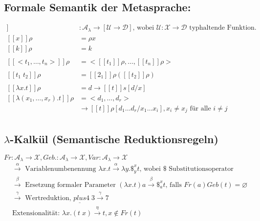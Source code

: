 \subsection{Formale Semantik der Metasprache:}
\begin{align*}
[\![ \; ]\!] &: \mathcal{A}_\lambda \rightarrow [\mathcal{U} \rightarrow \mathcal{D}] \text{, wobei } \mathcal{U}:\mathcal{X} \rightarrow \mathcal{D} \text{ typhaltende Funktion.}\\
[\![ x ]\!] \rho &= \rho x \\
[\![ k ]\!] \rho &= k \tag{1}\\
\\
[\![ <t_1, \dots, t_n> ]\!] \rho &= <[\![ t_1 ]\!]\rho, \dots , [\![ t_n ]\!] \rho > \tag{2}\\
\\
[\![ t_1 \; t_2 ]\!] \rho &= [\![ 2_1 ]\!] \rho ([\![ t_2 ]\!] \rho)  \tag{3}\\
\\
[\![\lambda x.t ]\!] \rho &= d \rightarrow [\![ t ]\!] s [d/x] \tag{4a}\\
[\![ \lambda (x_1,\dots, x_r).t ]\!] \rho &= <d_1, \dots , d_r> \\
&\rightarrow [\![ t ]\!] \rho [d_1 \dots d_r / x_1 \dots x_i], x_i \neq x_j \text{ für alle } i \neq j \tag{4b}\\
\end{align*}

\subsection{$\lambda$-Kalkül (Semantische Reduktionsregeln)}
$Fr : \mathcal{A}_\lambda \rightarrow \mathcal{X}, Geb.: \mathcal{A}_\lambda \rightarrow \mathcal{X}, Var : \mathcal{A}_\lambda \rightarrow \mathcal{X}$ 
\begin{align*}
&\xrightarrow{\alpha} \text{ Variablenumbenennung } \lambda x.t \xrightarrow{\alpha} \lambda y. \$^x_y t \text{, wobei } \$ \text{ Substitutionsoperator}\\
&\xrightarrow{\beta}	\text{ Ersetzung formaler Parameter } (\lambda x.t) a \xrightarrow{\beta}	\$^x_a t \text{, falls } Fr(a) Geb(t) = \varnothing\\
&\xrightarrow{\gamma} \text{ Wertreduktion, } \underline{plus} 4\; 3 \xrightarrow{\gamma} 7 \\
&\text{Extensionalität: } \lambda x.(t\;x) \xrightarrow{\eta} t, x \notin Fr(t)\\ 
\end{align*}